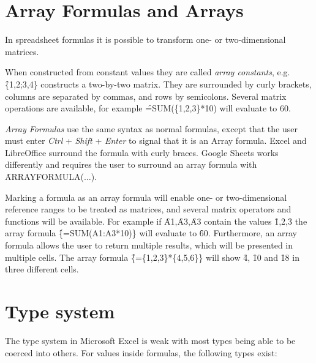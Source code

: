 \newpage

\section{Array Formulas and Arrays}
\label{sec:arrayformulas}
In spreadsheet formulas it is possible to transform one- or two-dimensional matrices.

When constructed from constant values they are called \emph{array constants}, e.g. \f{\{1,2;3,4\}} constructs a two-by-two matrix.
They are surrounded by curly brackets, columns are separated by commas, and rows by semicolons.
Several matrix operations are available, for example \f{=SUM(\{1,2,3\}*10)} will evaluate to 60.

\emph{Array Formulas} use the same syntax as normal formulas, except that the user must enter \emph{Ctrl} + \emph{Shift} + \emph{Enter} to signal that it is an Array formula.
Excel and LibreOffice surround the formula with curly braces.
Google Sheets works differently and requires the user to surround an array formula with \f{ARRAYFORMULA($\ldots$)}.

Marking a formula as an array formula will enable one- or two-dimensional reference ranges to be treated as matrices, and several matrix operators and functions will be available. 
For example if \f{A1},\f{A3},\f{A3} contain the values \f{1},\f{2},\f{3} the array formula \f{\{=SUM(A1:A3*10)\}} will evaluate to \f{60}.
Furthermore, an array formula allows the user to return multiple results, which will be presented in multiple cells.
The array formula \f{\{=\{1,2,3\}*\{4,5,6\}\}} will show \f{4}, \f{10} and \f{18} in three different cells.

\section{Type system}

The type system in Microsoft Excel is weak with most types being able to be coerced into others.
For values inside formulas, the following types exist:

